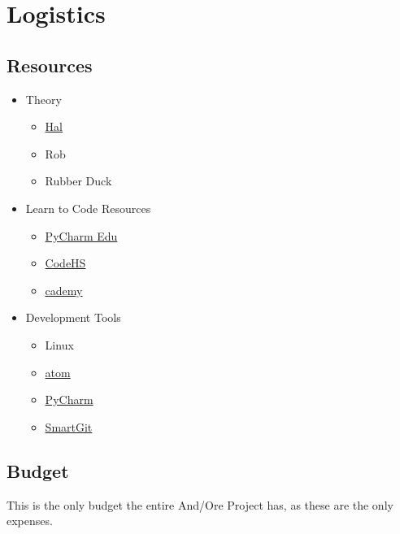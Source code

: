 \documentclass[11pt]{article}
\begin{document}
\section{{\color{blue}Logistics}}

\subsection{{\color{blue}Resources}}

\begin{itemize}
	\item Theory
		\begin{itemize}
			\item \href{http://baxter-academy.org/faculty#hlarsson}{Hal}
			\item Rob
			\item Rubber Duck
		\end{itemize}
	\item Learn to Code Resources
		\begin{itemize}
			\item \href{https://www.jetbrains.com/pycharm-edu/}{PyCharm Edu}
			\item \href{https://codehs.com/}{CodeHS}
			\item \href{http://www.codecademy.com/}{\underline{c}ademy}
		\end{itemize}
	\item Development Tools
		\begin{itemize}
			\item Linux
			\item \href{https://atom.io/}{atom}
			\item \href{https://www.jetbrains.com/pycharm/}{PyCharm}
			\item \href{http://www.syntevo.com/smartgit/}{SmartGit}
		\end{itemize}
\end{itemize}

\subsection{{\color{blue}Budget}}

This is the only budget the entire And/Ore Project has, as these are the only expenses.
\end{document}
